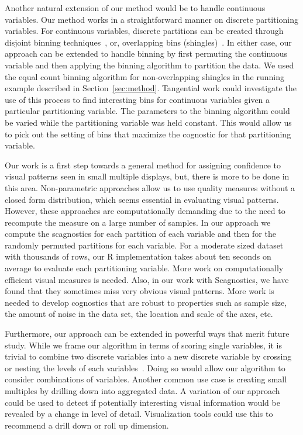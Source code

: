 Another natural extension of our method would be to handle continuous variables. Our method works in a straightforward manner on discrete partitioning variables. For continuous variables, discrete partitions can be created through disjoint binning techniques~\cite{Freedman1981,Scott2009}, or, overlapping bins (shingles)~\cite{Becker1996}. In either case, our approach can be extended to handle binning by first permuting the continuous variable and then applying the binning algorithm to partition the data. We used the equal count binning algorithm for non-overlapping shingles in the running example described in Section~\ref{sec:method}. Tangential work could investigate the use of this process to find interesting bins for continuous variables given a particular partitioning variable. The parameters to the binning algorithm could be varied while the partitioning variable was held constant. This would allow us to pick out the setting of bins that maximize the cognostic for that partitioning variable. 

Our work is a first step towards a general method for assigning confidence to visual patterns seen in small multiple displays, but, there is more to be done in this area. Non-parametric approaches allow us to use quality measures without a closed form distribution, which seems essential in evaluating visual patterns. However, these approaches are computationally demanding due to the need to recompute the measure on a large number of samples. In our approach we compute the scagnostics for each partition of each variable and then for the randomly permuted partitions for each variable. For a moderate sized dataset with thousands of rows, our R implementation takes about ten seconds on average to evaluate each partitioning variable. More work on computationally efficient visual measures is needed. Also, in our work with Scagnostics, we have found that they sometimes miss very obvious visual patterns. More work is needed to develop cognostics that are robust to properties such as sample size, the amount of noise in the data set, the location and scale of the axes, etc. 

Furthermore, our approach can be extended in powerful ways that merit future study. While we frame our algorithm in terms of scoring single variables, it is trivial to combine two discrete variables into a new discrete variable by crossing or nesting the levels of each variables~\cite{Wilkinson2005GG,Stolte2002}. Doing so would allow our algorithm to consider combinations of variables. 
Another common use case is creating small multiples by drilling down into aggregated data. A variation of our approach could be used to detect if potentially interesting visual information would be revealed by a change in level of detail. Visualization tools could use this to recommend a drill down or roll up dimension.

